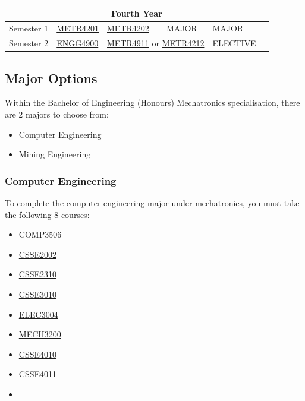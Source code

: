 \documentclass[a4paper,12pt]{report}
\begin{document}
\begin{table}[H]
    \centering
    \begin{tabular}{| m{6em} | m{5em} m{5em} m{5em} m{5em} m{5em} |}
        \hline
        \multicolumn{6}{|c|}{\bfseries Fourth Year} \\
        \hline
        Semester 1 & \hyperlink{METR4201}{METR4201} & \hyperlink{METR4202}{METR4202} & MAJOR & MAJOR & \\
        Semester 2 & \hyperlink{ENGG4900}{ENGG4900} & \multicolumn{2}{c}{\hyperlink{METR4911}{METR4911} or \hyperlink{METR4212}{METR4212}} & ELECTIVE & \\
        \hline
    \end{tabular}
\end{table}
\renewcommand{\arraystretch}{1}

\newpage

\subsection{Major Options}
Within the Bachelor of Engineering (Honours) Mechatronics specialisation, there are 2 majors to choose from:
\begin{itemize}
    \item Computer Engineering
    \item Mining Engineering
\end{itemize}

\subsubsection{Computer Engineering}
To complete the computer engineering major under mechatronics, you must take the following 8 courses:
\begin{multicols}{3}
    \begin{itemize}
        \item COMP3506
        \item \hyperlink{CSSE2002}{CSSE2002}
        \item \hyperlink{CSSE2310}{CSSE2310}
        \item \hyperlink{CSSE3010}{CSSE3010}
        \item \hyperlink{ELEC3004}{ELEC3004}
        \item \hyperlink{MECH3200}{MECH3200}
        \item \hyperlink{CSSE4010}{CSSE4010}
        \item \hyperlink{CSSE4011}{CSSE4011}
        \item[]
    \end{itemize}
\end{multicols}
\end{document}
